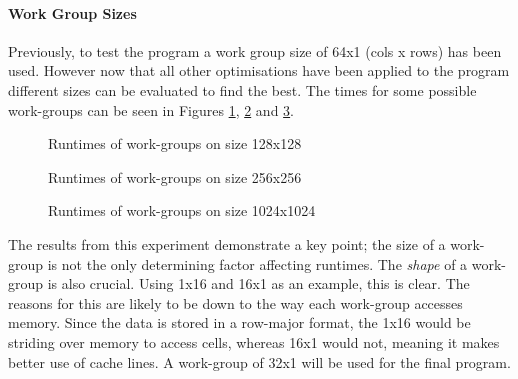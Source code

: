 


\paragraph{Work Group Sizes}
Previously, to test the program a work group size of 64x1 (cols x rows) has been used. However now that all other optimisations have been applied to the program different sizes can be evaluated to find the best. The times for some possible work-groups can be seen in Figures \ref{graph:wkg-128-128}, \ref{graph:wkg-256-256} and \ref{graph:wkg-1024-1024}. 

\begin{figure}[htb]
\vspace{-2mm}

\vspace{-5mm}
\caption{Runtimes of work-groups on size 128x128}
\label{graph:wkg-128-128}
\end{figure}


\begin{figure}[htb]
\vspace{-5mm}

\vspace{-3mm}
\caption{Runtimes of work-groups on size 256x256}
\label{graph:wkg-256-256}
\end{figure}

\begin{figure}[htb]
\vspace{-3mm}

\vspace{-5mm}
\caption{Runtimes of work-groups on size 1024x1024}
\label{graph:wkg-1024-1024}
\vspace{-3mm}
\end{figure}



The results from this experiment demonstrate a key point; the size of a work-group is not the only determining factor affecting runtimes. The \textit{shape} of a work-group is also crucial. Using 1x16 and 16x1 as an example, this is clear. The reasons for this are likely to be down to the way each work-group accesses memory. Since the data is stored in a row-major format, the 1x16 would be striding over memory to access cells, whereas 16x1 would not, meaning it makes better use of cache lines. A work-group of 32x1 will be used for the final program.

